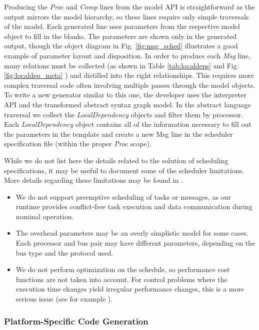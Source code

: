 Producing the \emph{Proc} and \emph{Comp} lines from the model 
API is straightforward as the output mirrors the model
hierarchy, so these lines require only simple traversals 
of the model.  Each generated line uses parameters 
from the respective model object to fill in the blanks.  
The parameters are shown only in the 
generated output, though the object diagram in 
Fig. \ref{fig:msg_sched} illustrates a good example 
of parameter layout and disposition.  In order to produce 
each \emph{Msg} line, many relations must be collected (as shown 
in Table \ref{tab:localdeps} and Fig. \ref{fig:localdep_meta} ) 
and distilled into the right relationships.  This requires 
more complex traversal code often involving multiple passes
through the model objects.   
To write a new generator similar to this one, the developer uses the 
interpreter API and the transformed abstract syntax graph model.  
In the abstract language traversal we collect the 
\emph{LocalDependency} objects and filter them by processor. 
Each \emph{LocalDependency} object contains all of the 
information necessary to fill out the parameters in 
the template and create a new Msg line in the
scheduler specification file (within the proper \emph{Proc} scope).

While we do not list here the details related to 
the solution of scheduling specifications, it may be useful 
to document some of the scheduler limitations.  More 
details regarding these limitations may be found in 
\cite{sched:analysis}.

\begin{itemize}
\item We do not support preemptive scheduling of tasks or messages, 
as our runtime provides conflict-free task execution and data
communication during nominal operation.
\item The overhead parameters may be an overly simplistic model for some cases. Each processor and bus 
pair may have different parameters, depending on the bus type and the protocol used.
\item We do not perform optimization on the schedule, so performance cost functions are not taken into 
account.  For control problems where the execution time changes yield irregular performance changes, this 
is a more serious issue (see for example \cite{control:scheduling} ).
\end{itemize}

\subsubsection*{Platform-Specific Code Generation}

